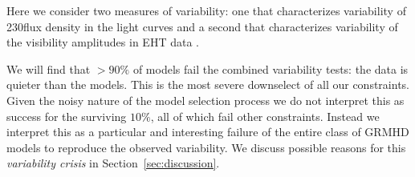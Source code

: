 Here we consider two measures of variability: one that characterizes variability of 230\GHz flux density in the light curves \citep{Wielgus2022} and a second that characterizes variability of the visibility amplitudes in EHT data \citep{PaperIV, NoiseModeling}.

We will find that $> 90\%$ of models fail the combined variability tests: the data is quieter than the models.  This is the most severe downselect of all our constraints. Given the noisy nature of the model selection process we do not interpret this as success for the surviving $10\%$, all of which fail other constraints.  Instead we interpret this as a particular and interesting failure of the entire class of GRMHD models to reproduce the observed variability.  We discuss possible reasons for this {\em variability crisis} in Section~\ref{sec:discussion}.



